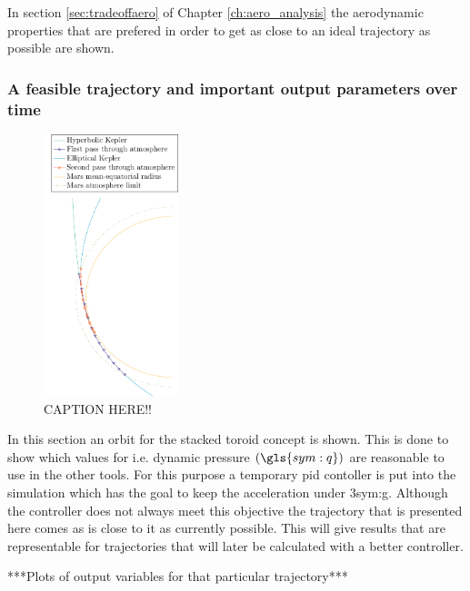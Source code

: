 In section \ref{sec:tradeoffaero} of Chapter \ref{ch:aero_analysis} the aerodynamic properties that are prefered in order to get as close to an ideal trajectory as possible are shown.

\subsubsection{A feasible trajectory and important output parameters over time}
\label{sec:astrorestraj}
\begin{figure}
	\centering
	\includegraphics[width=0.35\textwidth]{Figure/orbital_model/orbit.pdf}
	\caption{ CAPTION HERE!! }
	\label{fig:orbit}
\end{figure}
In this section an orbit for the stacked toroid concept is shown. This is done to show which values for i.e. dynamic pressure $\left(\gls{sym:q}\right)$ are reasonable to use in the other tools. For this purpose a temporary \gls{pid} contoller is put into the simulation which has the goal to keep the acceleration under 3\gls{sym:g}. Although the controller does not always meet this objective the trajectory that is presented here comes as is close to it as currently possible. This will give results that are representable for trajectories that will later be calculated with a better controller.



***Plots of output variables for that particular trajectory***\\